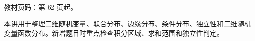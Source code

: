 
\begin{knowledgeBox}
教材页码：第 62 页起。

本讲用于整理二维随机变量、联合分布、边缘分布、条件分布、独立性和二维随机变量函数分布。新增题目时重点检查积分区域、求和范围和独立性判定。
\end{knowledgeBox}
